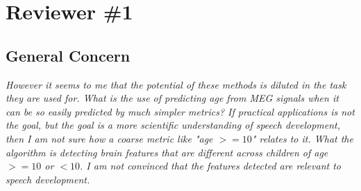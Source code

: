 \documentclass{article}
\begin{document}
\section*{Reviewer \#1}

\subsection*{General Concern}
{\em However it seems to me that the potential of these methods is diluted in the task they are used for. What is the use of predicting age from MEG signals when it can be so easily predicted by much simpler metrics? If practical applications is not the goal, but the goal is a more scientific understanding of speech development, then I am not sure how a coarse metric like "age $>=10$" relates to it. What the algorithm is detecting brain features that are different across children of age $>=10$ or $<10$. I am not convinced that the features detected are relevant to speech development.}
\end{document}

